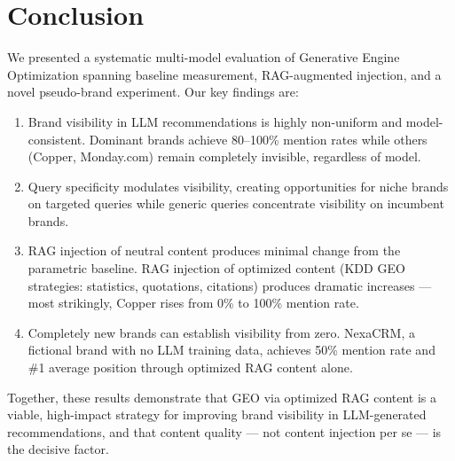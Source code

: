 \documentclass{article}
\begin{document}
\section{Conclusion}

We presented a systematic multi-model evaluation of Generative Engine Optimization spanning baseline measurement, RAG-augmented injection, and a novel pseudo-brand experiment. Our key findings are:

\begin{enumerate}
  \item Brand visibility in LLM recommendations is highly non-uniform and model-consistent. Dominant brands achieve 80–100\% mention rates while others (Copper, Monday.com) remain completely invisible, regardless of model.
  \item Query specificity modulates visibility, creating opportunities for niche brands on targeted queries while generic queries concentrate visibility on incumbent brands.
  \item RAG injection of neutral content produces minimal change from the parametric baseline. RAG injection of optimized content (KDD GEO strategies: statistics, quotations, citations) produces dramatic increases — most strikingly, Copper rises from 0\% to 100\% mention rate.
  \item Completely new brands can establish visibility from zero. NexaCRM, a fictional brand with no LLM training data, achieves 50\% mention rate and \#1 average position through optimized RAG content alone.
\end{enumerate}

Together, these results demonstrate that GEO via optimized RAG content is a viable, high-impact strategy for improving brand visibility in LLM-generated recommendations, and that content quality — not content injection per se — is the decisive factor.
\end{document}
